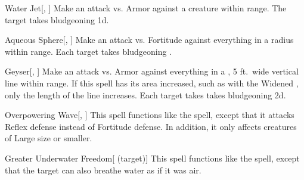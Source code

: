 \lowercase{\hypertarget{spell:Water Jet}{}}\label{spell:Water Jet}
\begin{freeability}[\nth{1}]{\hypertarget{spell:Water Jet}{Water Jet}}[, ]
Make an attack vs. Armor against a creature within \rngmed range.
\hit The target takes bludgeoning  \plus1d.
\end{freeability}
\vspace{0.25em}



\lowercase{\hypertarget{spell:Aqueous Sphere}{}}\label{spell:Aqueous Sphere}
\begin{freeability}[\nth{2}]{\hypertarget{spell:Aqueous Sphere}{Aqueous Sphere}}[, ]
Make an attack vs. Fortitude against everything in a \areasmall radius within \rngclose range.
\hit Each target takes bludgeoning .
\end{freeability}
\vspace{0.25em}



\lowercase{\hypertarget{spell:Geyser}{}}\label{spell:Geyser}
\begin{freeability}[\nth{2}]{\hypertarget{spell:Geyser}{Geyser}}[, ]
Make an attack vs. Armor against everything in a \arealarge, 5 ft.\ wide vertical line within \rngmed range.
If this spell has its area increased, such as with the Widened , only the length of the line increases.
\hit Each target takes takes bludgeoning  \plus2d.
\end{freeability}
\vspace{0.25em}



\lowercase{\hypertarget{spell:Overpowering Wave}{}}\label{spell:Overpowering Wave}
\begin{freeability}[\nth{2}]{\hypertarget{spell:Overpowering Wave}{Overpowering Wave}}[, ]
This spell functions like the  spell, except that it attacks Reflex defense instead of Fortitude defense.
In addition, it only affects creatures of Large size or smaller.
\end{freeability}
\vspace{0.25em}



\lowercase{\hypertarget{spell:Greater Underwater Freedom}{}}\label{spell:Greater Underwater Freedom}
\begin{attuneability}[\nth{3}]{\hypertarget{spell:Greater Underwater Freedom}{Greater Underwater Freedom}}[ (target)]
This spell functions like the  spell, except that the target can also breathe water as if it was air.
\end{attuneability}
\vspace{0.25em}



